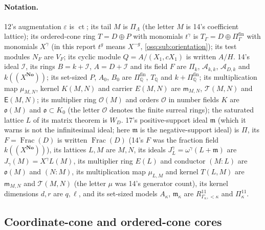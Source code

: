 \documentclass[11pt,letterpaper]{article}
\numberwithin{equation}{section}
\theoremstyle{definition}
\theoremstyle{remark}
\theoremstyle{plain}
\newcommand{\No}{\mathbf{No}}
\newcommand{\Q}{\mathbb Q}
\newcommand{\A}{\mathcal A}          %
\newcommand{\mm}{\mathfrak m}        %
\newcommand{\OO}{\mathcal O}         %
\newcommand{\hahn}[2]{#1(\!(X^{#2})\!)}
\newcommand{\ct}{\operatorname{ct}}
\newcommand{\Frac}{\operatorname{Frac}}
\begin{document}
\paragraph{Notation.} 12's augmentation $\varepsilon$ is $\ct$; its tail $M$ is $\Pi_\Lambda$ (the letter $M$ is
14's coefficient lattice); its ordered-cone ring $T=D\oplus P$ with monomials $t^\gamma$ is
$T_\Gamma=D\oplus\Pi^{\mathrm{fin}}_\Gamma$ with monomials $X^\gamma$ (in this report $t^g$ means $X^{-g}$,
\cref{osq:sub:orientation}); its test modules $N_F$ are $V_F$; its cyclic module $Q=A/(X_1,cX_1)$ is written
$A/H$. 14's ideal $\mathcal I$, its rings $B=k+\mathcal I$, $A=D+\mathcal I$ and its field $F$ are $\Pi_k$,
$\A_{k,k}$, $\A_{D,k}$ and $\hahn k\No$; its set-sized $P$, $A_0$, $B_0$ are $\Pi^{\mathrm{fin}}_\Q$,
$T_\Q$ and $k+\Pi^{\mathrm{fin}}_\Q$; its multiplication map $\mu_{M,N}$, kernel $K(M,N)$ and carrier $E(M,N)$
are $\mathsf m_{M,N}$, $\mathcal T(M,N)$ and $\mathsf E(M,N)$; its multiplier ring $\mathcal O(M)$ and orders
$\mathcal O$ in number fields $K$ are $\mathfrak o(M)$ and $\mathfrak o\subset K_0$ (the letter $\OO$ denotes the
finite surreal rings); the saturated lattice $L$ of its matrix theorem is $W_D$. 17's positive-support ideal $\mathfrak m$
(which it warns is not the infinitesimal ideal; here $\mm$ is the negative-support ideal) is $\Pi$, its $F=\Frac(D)$ is written
$\Frac(D)$ (14's $F$ was the fraction field $\hahn k\No$), its lattices $L,M$ are $M,N$, its ideals
$J_L^\gamma=\omega^\gamma(L+\mathfrak m)$ are $J_\gamma(M)=X^\gamma L(M)$, its multiplier ring $E(L)$ and conductor $(M:L)$ are
$\mathfrak o(M)$ and $(N:M)$, its multiplication map $\mu_{L,M}$ and kernel $T(L,M)$ are $\mathsf m_{M,N}$ and $\mathcal T(M,N)$
(the letter $\mu$ was 14's generator count), its kernel dimensions $d,r$ are $q,\ell$, and its set-sized models $A_\kappa$,
$\mathfrak m_\kappa$ are $R^{11}_{\Gamma_\kappa,<\kappa}$ and $\Pi^{11}_\kappa$.

\subsection{Coordinate-cone and ordered-cone cores}\label{osq:hd:sub:cores}
\end{document}
